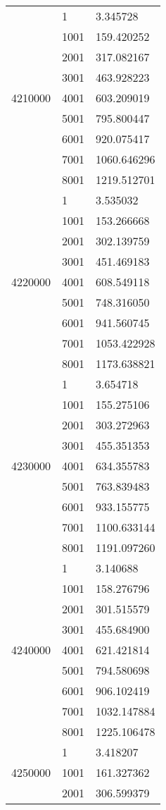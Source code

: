 \begin{table}[htb!]
\begin{tabular}{lll}
\multirow[c]{9}{*}{4210000} & 1 & 3.345728 \\
 & 1001 & 159.420252 \\
 & 2001 & 317.082167 \\
 & 3001 & 463.928223 \\
 & 4001 & 603.209019 \\
 & 5001 & 795.800447 \\
 & 6001 & 920.075417 \\
 & 7001 & 1060.646296 \\
 & 8001 & 1219.512701 \\
\multirow[c]{9}{*}{4220000} & 1 & 3.535032 \\
 & 1001 & 153.266668 \\
 & 2001 & 302.139759 \\
 & 3001 & 451.469183 \\
 & 4001 & 608.549118 \\
 & 5001 & 748.316050 \\
 & 6001 & 941.560745 \\
 & 7001 & 1053.422928 \\
 & 8001 & 1173.638821 \\
\multirow[c]{9}{*}{4230000} & 1 & 3.654718 \\
 & 1001 & 155.275106 \\
 & 2001 & 303.272963 \\
 & 3001 & 455.351353 \\
 & 4001 & 634.355783 \\
 & 5001 & 763.839483 \\
 & 6001 & 933.155775 \\
 & 7001 & 1100.633144 \\
 & 8001 & 1191.097260 \\
\multirow[c]{9}{*}{4240000} & 1 & 3.140688 \\
 & 1001 & 158.276796 \\
 & 2001 & 301.515579 \\
 & 3001 & 455.684900 \\
 & 4001 & 621.421814 \\
 & 5001 & 794.580698 \\
 & 6001 & 906.102419 \\
 & 7001 & 1032.147884 \\
 & 8001 & 1225.106478 \\
\multirow[c]{9}{*}{4250000} & 1 & 3.418207 \\
 & 1001 & 161.327362 \\
 & 2001 & 306.599379 \\

\end{tabular}
\end{table}
